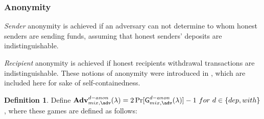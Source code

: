 \documentclass[a4paper]{article}
\theoremstyle{definition}
\newtheorem{definition}{Definition}[section]
\begin{document}
\subsubsection{Anonymity} \label{sec:defanonymity}
\textit{Sender} anonymity is achieved if an adversary can not determine to whom honest senders are sending funds, assuming that honest senders' deposits are indistinguishable.

\textit{Recipient} anonymity is achieved if honest recipients withdrawal transactions are indistinguishable. These notions of anonymity were introduced in \cite{meiklejohn2018mobius}, which are included here for sake of self-containedness.

\begin{definition}
	Define $\textbf{Adv}^{d-anon}_{mix,\adv}(\lambda) = 2\Pr[\textsf{G}^{d-anon}_{mix,\adv}(\lambda)]-1\ for\ d \in \{dep, with\}$, where these games are defined as follows:



\end{definition}
\end{document}
